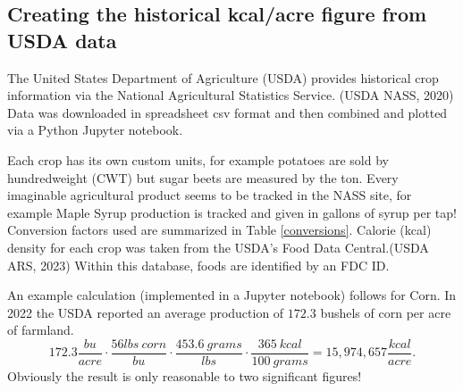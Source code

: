 \documentclass[11pt,letter]{article}
\newcommand{\be}{\begin{equation}}
\newcommand{\ee}{\end{equation}}
\begin{document}
\subsection{Creating the historical kcal/acre figure from USDA data}
\label{how_yield_plot_is_made}
The United States Department of Agriculture (USDA) provides historical crop information via the National Agricultural Statistics Service. (USDA NASS, 2020)
Data was downloaded in spreadsheet csv format and then combined and plotted via a Python Jupyter notebook.   

Each crop has its own custom units, for example potatoes are sold by hundredweight (CWT) but sugar beets are measured by the ton.  
Every imaginable agricultural product seems to be tracked in the NASS site, for example Maple Syrup production is tracked and given in gallons of syrup per tap! 
Conversion factors used are summarized in Table \ref{conversions}.  
Calorie (kcal) density for each crop was taken from the USDA's Food Data Central.(USDA ARS, 2023)
Within this database, foods are identified by an FDC ID.  

An example calculation (implemented in a Jupyter notebook) follows for Corn.  
In 2022 the USDA reported an average production of $172.3$ bushels of corn per acre of farmland.  
\be
172.3\frac{bu}{acre}\cdot\frac{56lbs~corn}{bu}\cdot\frac{453.6~grams}{lbs}\cdot\frac{365~kcal}{100~grams} = 15,974,657 \frac{kcal}{acre} .
\label{example_calculation}
\ee
Obviously the result is only reasonable to two significant figures!
\end{document}
